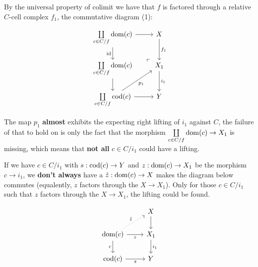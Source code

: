 \begin{intro}
            \par By the universal property of colimit we have that $f$ is factored through a relative $C$-cell complex $f_1$,
            the commutative diagram (1):

            \[\begin{tikzcd}
                {{\coprod\limits_{c\in C/f} \dom(c)}} & X \\
                {{\coprod\limits_{c\in C/f} \dom(c)}} & {X_1} \\
                {{\coprod\limits_{c\in C/f} \cod(c)}} & Y
                \arrow["\id"', from=1-1, to=2-1]
                \arrow[from=2-1, to=3-1]
                \arrow[from=3-1, to=3-2]
                \arrow["i_1", from=2-2, to=3-2]
                \arrow[from=1-1, to=1-2]
                \arrow["{f_1}", from=1-2, to=2-2]
                \arrow["{p_1}"', from=3-1, to=2-2]
                \arrow["{\Big \lrcorner}"{anchor=center, pos=0.125, rotate=180}, shift left=1, draw=none, from=2-2, to=1-1]
            \end{tikzcd}\]

            \par The map $p_1$ \textbf{almost} exhibits the expecting right lifting of $i_1$ against $C$,
            the failure of that to hold on is only the fact that the morphism ${{\coprod\limits_{c\in C/f} \operatorname{dom}(c)}} \to {X_1} $ is missing,
            which means that \textbf{not all} $c \in C/i_1$ could have a lifting.
            \par If we have $c \in C/i_1$ with $s : \operatorname{cod}(c) \to Y$ and $z : \operatorname{dom}(c) \to X_1$ be the morphism $c \to i_1$,
            we \textbf{don't always} have a $\hat{z} : \operatorname{dom}(c) \to X$ makes the diagram below commutes
            (equalently, $z$ factors through the $X \to X_1$).
            Only for those $c \in C/i_1$ such that $z$ factors through the $X \to X_1$,
            the lifting could be found.

            \[\begin{tikzcd}
                & X \\
                {\dom(c)} & {X_1} \\
                {\cod(c)} & Y
                \arrow["c"', from=2-1, to=3-1]
                \arrow["s"', from=3-1, to=3-2]
                \arrow["z"', from=2-1, to=2-2]
                \arrow["{i_1}", from=2-2, to=3-2]
                \arrow["{\hat{z}}", dotted, from=2-1, to=1-2]
                \arrow[from=1-2, to=2-2]
            \end{tikzcd}\]


\end{intro}
